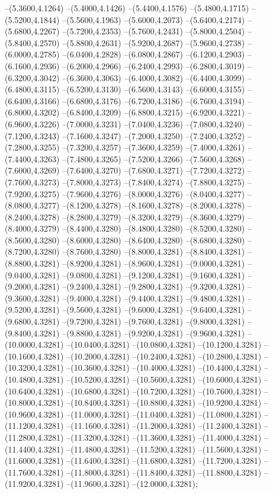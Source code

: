 {	--(5.3600,4.1264)
	--(5.4000,4.1426)
	--(5.4400,4.1576)
	--(5.4800,4.1715)
	--(5.5200,4.1844)
	--(5.5600,4.1963)
	--(5.6000,4.2073)
	--(5.6400,4.2174)
	--(5.6800,4.2267)
	--(5.7200,4.2353)
	--(5.7600,4.2431)
	--(5.8000,4.2504)
	--(5.8400,4.2570)
	--(5.8800,4.2631)
	--(5.9200,4.2687)
	--(5.9600,4.2738)
	--(6.0000,4.2785)
	--(6.0400,4.2828)
	--(6.0800,4.2867)
	--(6.1200,4.2903)
	--(6.1600,4.2936)
	--(6.2000,4.2966)
	--(6.2400,4.2993)
	--(6.2800,4.3019)
	--(6.3200,4.3042)
	--(6.3600,4.3063)
	--(6.4000,4.3082)
	--(6.4400,4.3099)
	--(6.4800,4.3115)
	--(6.5200,4.3130)
	--(6.5600,4.3143)
	--(6.6000,4.3155)
	--(6.6400,4.3166)
	--(6.6800,4.3176)
	--(6.7200,4.3186)
	--(6.7600,4.3194)
	--(6.8000,4.3202)
	--(6.8400,4.3209)
	--(6.8800,4.3215)
	--(6.9200,4.3221)
	--(6.9600,4.3226)
	--(7.0000,4.3231)
	--(7.0400,4.3236)
	--(7.0800,4.3240)
	--(7.1200,4.3243)
	--(7.1600,4.3247)
	--(7.2000,4.3250)
	--(7.2400,4.3252)
	--(7.2800,4.3255)
	--(7.3200,4.3257)
	--(7.3600,4.3259)
	--(7.4000,4.3261)
	--(7.4400,4.3263)
	--(7.4800,4.3265)
	--(7.5200,4.3266)
	--(7.5600,4.3268)
	--(7.6000,4.3269)
	--(7.6400,4.3270)
	--(7.6800,4.3271)
	--(7.7200,4.3272)
	--(7.7600,4.3273)
	--(7.8000,4.3273)
	--(7.8400,4.3274)
	--(7.8800,4.3275)
	--(7.9200,4.3275)
	--(7.9600,4.3276)
	--(8.0000,4.3276)
	--(8.0400,4.3277)
	--(8.0800,4.3277)
	--(8.1200,4.3278)
	--(8.1600,4.3278)
	--(8.2000,4.3278)
	--(8.2400,4.3278)
	--(8.2800,4.3279)
	--(8.3200,4.3279)
	--(8.3600,4.3279)
	--(8.4000,4.3279)
	--(8.4400,4.3280)
	--(8.4800,4.3280)
	--(8.5200,4.3280)
	--(8.5600,4.3280)
	--(8.6000,4.3280)
	--(8.6400,4.3280)
	--(8.6800,4.3280)
	--(8.7200,4.3280)
	--(8.7600,4.3280)
	--(8.8000,4.3281)
	--(8.8400,4.3281)
	--(8.8800,4.3281)
	--(8.9200,4.3281)
	--(8.9600,4.3281)
	--(9.0000,4.3281)
	--(9.0400,4.3281)
	--(9.0800,4.3281)
	--(9.1200,4.3281)
	--(9.1600,4.3281)
	--(9.2000,4.3281)
	--(9.2400,4.3281)
	--(9.2800,4.3281)
	--(9.3200,4.3281)
	--(9.3600,4.3281)
	--(9.4000,4.3281)
	--(9.4400,4.3281)
	--(9.4800,4.3281)
	--(9.5200,4.3281)
	--(9.5600,4.3281)
	--(9.6000,4.3281)
	--(9.6400,4.3281)
	--(9.6800,4.3281)
	--(9.7200,4.3281)
	--(9.7600,4.3281)
	--(9.8000,4.3281)
	--(9.8400,4.3281)
	--(9.8800,4.3281)
	--(9.9200,4.3281)
	--(9.9600,4.3281)
	--(10.0000,4.3281)
	--(10.0400,4.3281)
	--(10.0800,4.3281)
	--(10.1200,4.3281)
	--(10.1600,4.3281)
	--(10.2000,4.3281)
	--(10.2400,4.3281)
	--(10.2800,4.3281)
	--(10.3200,4.3281)
	--(10.3600,4.3281)
	--(10.4000,4.3281)
	--(10.4400,4.3281)
	--(10.4800,4.3281)
	--(10.5200,4.3281)
	--(10.5600,4.3281)
	--(10.6000,4.3281)
	--(10.6400,4.3281)
	--(10.6800,4.3281)
	--(10.7200,4.3281)
	--(10.7600,4.3281)
	--(10.8000,4.3281)
	--(10.8400,4.3281)
	--(10.8800,4.3281)
	--(10.9200,4.3281)
	--(10.9600,4.3281)
	--(11.0000,4.3281)
	--(11.0400,4.3281)
	--(11.0800,4.3281)
	--(11.1200,4.3281)
	--(11.1600,4.3281)
	--(11.2000,4.3281)
	--(11.2400,4.3281)
	--(11.2800,4.3281)
	--(11.3200,4.3281)
	--(11.3600,4.3281)
	--(11.4000,4.3281)
	--(11.4400,4.3281)
	--(11.4800,4.3281)
	--(11.5200,4.3281)
	--(11.5600,4.3281)
	--(11.6000,4.3281)
	--(11.6400,4.3281)
	--(11.6800,4.3281)
	--(11.7200,4.3281)
	--(11.7600,4.3281)
	--(11.8000,4.3281)
	--(11.8400,4.3281)
	--(11.8800,4.3281)
	--(11.9200,4.3281)
	--(11.9600,4.3281)
	--(12.0000,4.3281);
}
